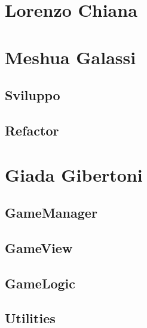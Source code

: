         \section{Lorenzo Chiana}\label{sec:chiana}
            
    
        
        \section{Meshua Galassi}\label{sec:galassi}
            
            \subsection{Sviluppo}\label{subsec:galassi:sviluup}
                
            \subsection{Refactor}\label{subsec:galassi:refactor}
                
        \clearpage
    
        \section{Giada Gibertoni}\label{sec:gibertoni}
            
            \subsection{GameManager}
            
            \subsection{GameView}
            
            \subsection{GameLogic}
            
            \subsection{Utilities}
            
        
